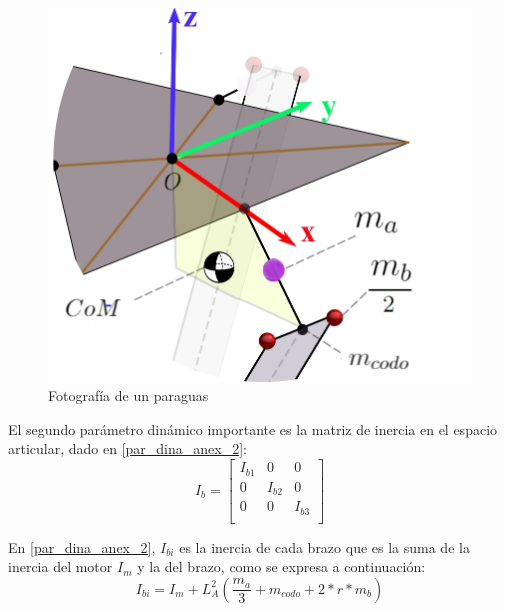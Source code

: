                
            \begin{figure}[H]
              \centering
	          \includegraphics[width=0.7\linewidth]{Main/Chapter4/Images4/DIBUJO41.jpg}
              \caption{Fotografía de un paraguas}
              \label{f:Cap4_Metodo_B_Modelacion_Dinamica_2}
        \end{figure}
                
                
                
                
                
                El segundo parámetro dinámico importante es la matriz de inercia en el espacio articular, dado en \ref{par_dina_anex_2}:
                \begin{equation}
                 I_{b}= \left[ \begin{matrix}
                I_{b1}  &  0  &  0\\
                0  &  I_{b2}  &  0\\
                0  &  0  &  I_{b3}\\
                \end{matrix}
                 \right]
                \label{par_dina_anex_2}                    
                \end{equation}

                En \ref{par_dina_anex_2},  \( I_{bi} \)  es la inercia de cada brazo que es la suma de la inercia del motor  \( I_{m}\)  y la del brazo, como se expresa a continuación:
                \begin{equation}
                 I_{bi}=I_{m}+ L_{A}^{2} \left( \frac{m_{a}}{3}+m_{codo}+2\ast r\ast m_{b} \right) 
                \end{equation}
                
